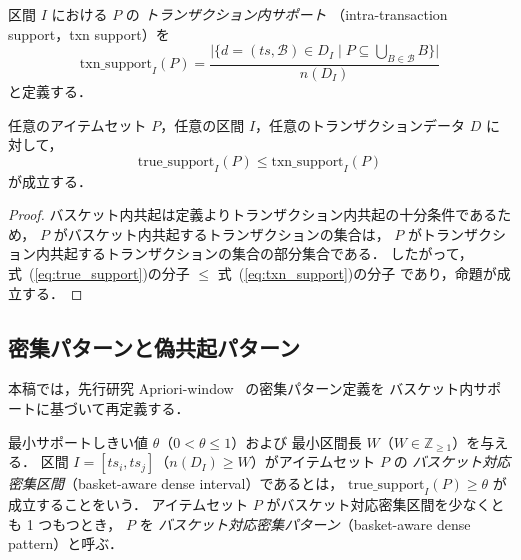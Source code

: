 \begin{definition}
\label{def:txn_support}
区間 $I$ における $P$ の \emph{トランザクション内サポート}
（intra-transaction support，txn support）を
\begin{equation}
\text{txn\_support}_I(P) =
\frac{\bigl|\bigl\{d = (ts, \mathcal{B}) \in D_I
\;\big|\; P \subseteq \textstyle\bigcup_{B \in \mathcal{B}} B\bigr\}\bigr|}{n(D_I)}
\label{eq:txn_support}
\end{equation}
と定義する．
\end{definition}

\begin{proposition}[単調性]
\label{prop:monotone}
任意のアイテムセット $P$，任意の区間 $I$，任意のトランザクションデータ $D$ に対して，
\begin{equation}
\text{true\_support}_I(P) \leq \text{txn\_support}_I(P)
\end{equation}
が成立する．
\end{proposition}

\begin{proof}
バスケット内共起は定義よりトランザクション内共起の十分条件であるため，
$P$ がバスケット内共起するトランザクションの集合は，
$P$ がトランザクション内共起するトランザクションの集合の部分集合である．
したがって，式~(\ref{eq:true_support})の分子 $\leq$ 式~(\ref{eq:txn_support})の分子
であり，命題が成立する．
\end{proof}

\subsection{密集パターンと偽共起パターン}

本稿では，先行研究 Apriori-window~\cite{dsaa2025} の密集パターン定義を
バスケット内サポートに基づいて再定義する．

\begin{definition}
\label{def:basket_dense}
最小サポートしきい値 $\theta$（$0 < \theta \leq 1$）および
最小区間長 $W$（$W \in \mathbb{Z}_{\geq 1}$）を与える．
区間 $I = [ts_i, ts_j]$（$n(D_I) \geq W$）がアイテムセット $P$ の
\emph{バスケット対応密集区間}（basket-aware dense interval）であるとは，
$\text{true\_support}_I(P) \geq \theta$ が成立することをいう．
アイテムセット $P$ がバスケット対応密集区間を少なくとも 1 つもつとき，
$P$ を \emph{バスケット対応密集パターン}（basket-aware dense pattern）と呼ぶ．
\end{definition}

